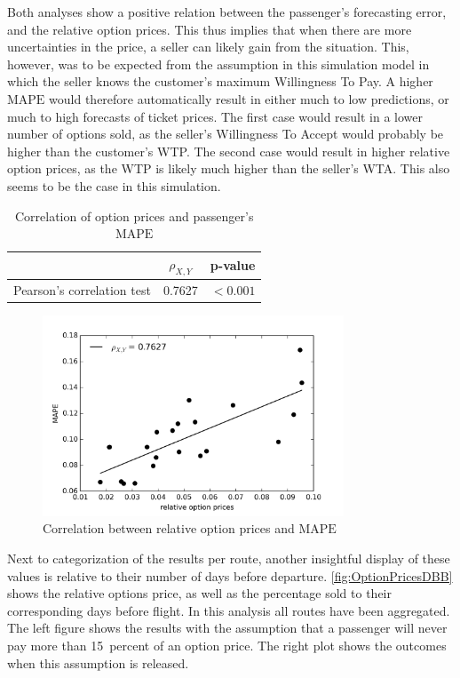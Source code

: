 Both analyses show a positive relation between the passenger's forecasting error, and the relative option prices. This thus implies that when there are more uncertainties in the price, a seller can likely gain from the situation. This, however, was to be expected from the assumption in this simulation model in which the seller knows the customer's maximum Willingness To Pay. A higher $\mbox{MAPE}$ would therefore automatically result in either much to low predictions, or much to high forecasts of ticket prices. The first case would result in a lower number of options sold, as the seller's Willingness To Accept would probably be higher than the customer's WTP. The second case would result in higher relative option prices, as the WTP is likely much higher than the seller's WTA. This also seems to be the case in this simulation.


\begin{table}
\centering
\begin{tabular}{l c c}
\toprule
~  &  $\rho_{X,Y}$  &  p-value   \\
\midrule
Pearson's correlation test &  0.7627  &  $< 0.001$ \\
\bottomrule
\end{tabular}
\caption{Correlation of option prices and passenger's $\mbox{MAPE}$}
\label{tbl:pearsonPricesMAPE}
\end{table}


\begin{figure}
    \centering
    \includegraphics[width=0.8\textwidth]{figures/correlation_optionPrices-MAPE}
    \caption{Correlation between relative option prices and $\mbox{MAPE}$}
    \label{fig:optionPricesMAPE}
\end{figure}


Next to categorization of the results per route, another insightful display of these values is relative to their number of days before departure. \autoref{fig:OptionPricesDBB} shows the relative options price, as well as the percentage sold to their corresponding days before flight. In this analysis all routes have been aggregated. The left figure shows the results with the assumption that a passenger will never pay more than 15~percent of an option price. The right plot shows the outcomes when this assumption is released.

